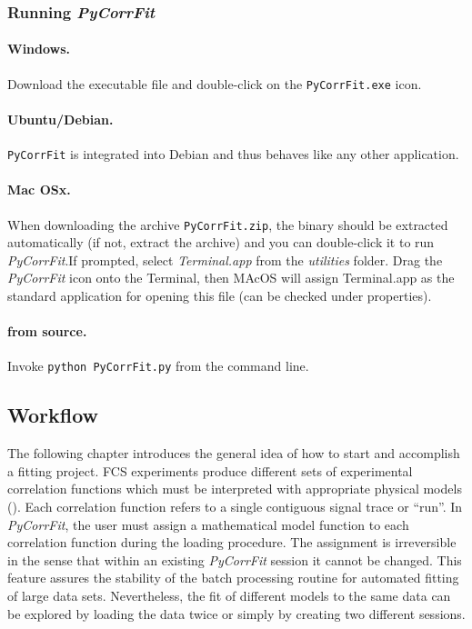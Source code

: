 \subsubsection{Running \textit{PyCorrFit}}
\label{sec:intro.runni}
\paragraph*{Windows.}
Download the executable file and double-click on the \texttt{PyCorrFit.exe} icon.
\paragraph*{Ubuntu/Debian.}
\texttt{PyCorrFit} is integrated into Debian and thus behaves like any other application.
\paragraph*{Mac OSx.}
When downloading the archive \texttt{PyCorrFit.zip}, the binary should be extracted automatically (if not, extract the archive) and you can double-click it to run \textit{PyCorrFit}.If prompted, select \textit{Terminal.app} from the \textit{utilities} folder. Drag the \textit{PyCorrFit} icon onto the Terminal, then MAcOS will assign Terminal.app as the standard application for opening this file (can be checked under properties).
\paragraph*{from source.}
Invoke \texttt{python PyCorrFit.py} from the command line.

\subsection{Workflow}
\label{sec:intro.workf}

The following chapter introduces the general idea of how to start and accomplish a fitting project. FCS experiments produce different sets of experimental correlation functions which must be interpreted with appropriate physical models (). Each correlation function refers to a single contiguous signal trace or ``run''. In \textit{PyCorrFit}, the user must assign a mathematical model function to each correlation function during the loading procedure. The assignment is irreversible in the sense that within an existing \textit{PyCorrFit} session it cannot be changed. This feature assures the stability of the batch processing routine for automated fitting of large data sets. Nevertheless, the fit of different models to the same data can be explored by loading the data twice or simply by creating two different sessions.

